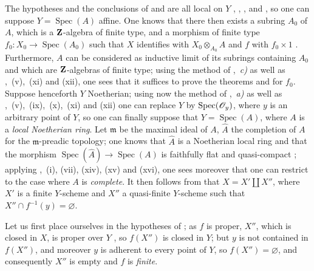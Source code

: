 \begin{env}[8.11.4]
\label{IV.8.11.4}
The hypotheses and the conclusions of  and  are all local on $Y$ , , ,  and , so one can suppose $Y=\operatorname{Spec}(A)$ affine.
One knows that there then exists a subring $A_0$ of $A$, which is a $\mathbf{Z}$-algebra of finite type, and a morphism of finite type $f_0:X_0\to\operatorname{Spec}(A_0)$ such that $X$ identifies with $X_0\otimes_{A_0}A$ and $f$ with $f_0\times 1$ .
Furthermore, $A$ can be considered as inductive limit of its subrings containing $A_0$ and which are $\mathbf{Z}$-algebras of finite type; using the method of ,~\emph{c)} as well as ,~(v),~(xi) and (xii), one sees that it suffices to prove the theorems  and  for $f_0$.
Suppose henceforth $Y$ Noetherian; using now the method of ,~\emph{a)} as well as ,~(v),~(ix),~(x),~(xi) and (xii) one can replace $Y$ by $\operatorname{Spec}(\mathscr{O}_y)$, where $y$ is an
arbitrary point of $Y$, so one can finally suppose that $Y=\operatorname{Spec}(A)$, where $A$ is a \emph{local Noetherian ring}.
Let $\mathfrak{m}$ be the maximal ideal of $A$, $\hat{A}$ the completion of $A$ for the $\mathfrak{m}$-preadic topology; one knows that $\hat{A}$ is a Noetherian local ring and that the morphism $\operatorname{Spec}(\hat{A})\to\operatorname{Spec}(A)$ is faithfully flat and quasi-compact ; applying ,~(i), (vii), (xiv), (xv) and (xvi), one sees moreover that one can restrict to the case where $A$ is \emph{complete}.
It then follows from  that $X=X'\amalg X''$, where $X'$ is a finite $Y$-scheme and $X''$ a quasi-finite $Y$-scheme such that $X''\cap f^{-1}(y)=\varnothing$.
\end{env}

Let us first place ourselves in the hypotheses of ; as $f$ is proper, $X''$, which is closed in $X$, is proper over $Y$ , so $f(X'')$ is closed in $Y$; but $y$ is not contained in $f(X'')$, and moreover $y$ is adherent to every point of $Y$, so $f(X'')=\varnothing$, and consequently $X''$ is empty and $f$ is \emph{finite}.

